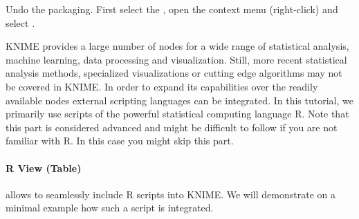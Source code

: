 \begin{task}
Undo the packaging. First select the , open the context menu (right-click) and select .
\end{task}

KNIME provides a large number of nodes for a wide range of statistical analysis, machine learning, data processing and visualization. Still, more recent statistical analysis methods, specialized visualizations or cutting edge algorithms may not be covered in KNIME. In order to expand its capabilities over the readily available nodes external scripting languages can be integrated. In this tutorial, we primarily use scripts of the powerful statistical computing language R. Note that this part is considered advanced and might be difficult to follow if you are not familiar with R. In this case you might skip this part.

\paragraph{R View (Table)} allows to seamlessly include R scripts into KNIME. We will demonstrate on a minimal example how such a script is integrated.

